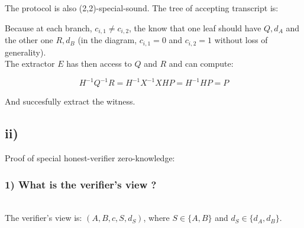 \documentclass{scrartcl}
\begin{document}
The protocol is also (2,2)-special-sound. The tree of accepting transcript is:


\begin{center}
\end{center}

Because at each branch, $c_{i,1} \neq c_{i, 2}$, the know that one leaf should have $Q, d_A$ and the other one $R, d_B$ (in the diagram, $c_{i,1} = 0$ and $c_{i, 2} = 1$ without loss of generality). \\
The extractor $E$ has then access to $Q$ and $R$ and can compute:

\begin{equation*}
  H^{-1}Q^{-1}R = H^{-1}X^{-1}XHP = H^{-1}HP = P
\end{equation*}

And succesfully extract the witness.


\subsection*{ii)} Proof of special honest-verifier zero-knowledge:

\subsubsection*{1) What is the verifier's view ?}\ \\
The verifier's view is: $(A, B, c, S, d_S)$, where $S \in \{A, B\}$ and $d_S \in \{d_A, d_B\}$.
\end{document}
